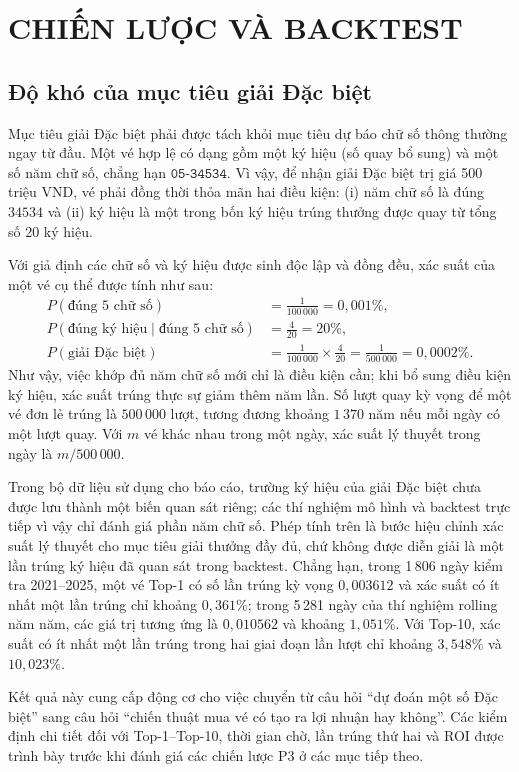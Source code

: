 \chapter{CHIẾN LƯỢC VÀ BACKTEST}
\section{Độ khó của mục tiêu giải Đặc biệt}
Mục tiêu giải Đặc biệt phải được tách khỏi mục tiêu dự báo chữ số thông thường ngay từ đầu. Một vé hợp lệ có dạng gồm một ký hiệu (số quay bổ sung) và một số năm chữ số, chẳng hạn $\texttt{05-34534}$. Vì vậy, để nhận giải Đặc biệt trị giá 500 triệu VND, vé phải đồng thời thỏa mãn hai điều kiện: (i) năm chữ số là đúng $34534$ và (ii) ký hiệu là một trong bốn ký hiệu trúng thưởng được quay từ tổng số 20 ký hiệu.

Với giả định các chữ số và ký hiệu được sinh độc lập và đồng đều, xác suất của một vé cụ thể được tính như sau:
\[
\begin{aligned}
	P(\text{đúng 5 chữ số}) &= \frac{1}{100\,000}=0{,}001\%,\\
	P(\text{đúng ký hiệu}\mid\text{đúng 5 chữ số}) &= \frac{4}{20}=20\%,\\
	P(\text{giải Đặc biệt}) &= \frac{1}{100\,000}\times\frac{4}{20}
	=\frac{1}{500\,000}=0{,}0002\%.
\end{aligned}
\]
Như vậy, việc khớp đủ năm chữ số mới chỉ là điều kiện cần; khi bổ sung điều kiện ký hiệu, xác suất trúng thực sự giảm thêm năm lần. Số lượt quay kỳ vọng để một vé đơn lẻ trúng là $500\,000$ lượt, tương đương khoảng $1\,370$ năm nếu mỗi ngày có một lượt quay. Với $m$ vé khác nhau trong một ngày, xác suất lý thuyết trong ngày là $m/500\,000$.

Trong bộ dữ liệu sử dụng cho báo cáo, trường ký hiệu của giải Đặc biệt chưa được lưu thành một biến quan sát riêng; các thí nghiệm mô hình và backtest trực tiếp vì vậy chỉ đánh giá phần năm chữ số. Phép tính trên là bước hiệu chỉnh xác suất lý thuyết cho mục tiêu giải thưởng đầy đủ, chứ không được diễn giải là một lần trúng ký hiệu đã quan sát trong backtest. Chẳng hạn, trong 1\,806 ngày kiểm tra 2021--2025, một vé Top-1 có số lần trúng kỳ vọng $0{,}003612$ và xác suất có ít nhất một lần trúng chỉ khoảng $0{,}361\%$; trong 5\,281 ngày của thí nghiệm rolling năm năm, các giá trị tương ứng là $0{,}010562$ và khoảng $1{,}051\%$. Với Top-10, xác suất có ít nhất một lần trúng trong hai giai đoạn lần lượt chỉ khoảng $3{,}548\%$ và $10{,}023\%$.

Kết quả này cung cấp động cơ cho việc chuyển từ câu hỏi ``dự đoán một số Đặc biệt'' sang câu hỏi ``chiến thuật mua vé có tạo ra lợi nhuận hay không''. Các kiểm định chi tiết đối với Top-1--Top-10, thời gian chờ, lần trúng thứ hai và ROI được trình bày trước khi đánh giá các chiến lược P3 ở các mục tiếp theo.

